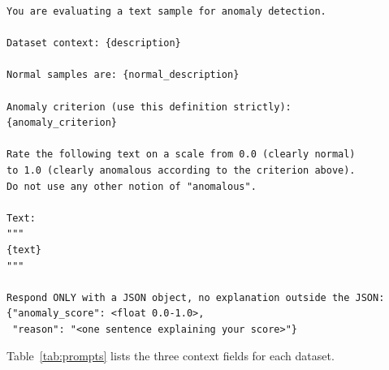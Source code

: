 \documentclass[12pt]{article}
\begin{document}
\begin{small}
\begin{verbatim}
You are evaluating a text sample for anomaly detection.

Dataset context: {description}

Normal samples are: {normal_description}

Anomaly criterion (use this definition strictly):
{anomaly_criterion}

Rate the following text on a scale from 0.0 (clearly normal)
to 1.0 (clearly anomalous according to the criterion above).
Do not use any other notion of "anomalous".

Text:
"""
{text}
"""

Respond ONLY with a JSON object, no explanation outside the JSON:
{"anomaly_score": <float 0.0-1.0>,
 "reason": "<one sentence explaining your score>"}
\end{verbatim}
\end{small}

Table~\ref{tab:prompts} lists the three context fields for each dataset.
\end{document}
